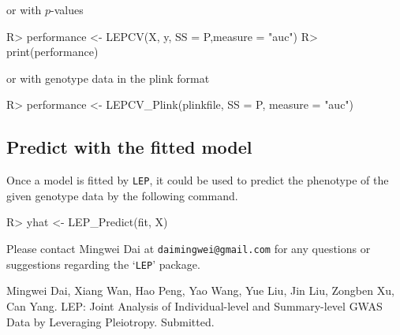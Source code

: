 \documentclass[11pt]{article}
\begin{document}
or with $p$-values
\begin{Schunk}
\begin{Sinput}
R>   performance <- LEPCV(X, y, SS = P,measure = "auc")
R>   print(performance)
\end{Sinput}
\end{Schunk}

or with genotype data in the plink format
\begin{Schunk}
\begin{Sinput}
R> performance <- LEPCV_Plink(plinkfile, SS = P, measure = "auc")
\end{Sinput}
\end{Schunk}


\subsection{Predict with the fitted model}\label{predict}
Once a model is fitted by \texttt{LEP}, it could be used to predict the phenotype of the given genotype data by the following command.
\begin{Schunk}
\begin{Sinput}
R> yhat <- LEP_Predict(fit, X)
\end{Sinput}
\end{Schunk}

Please contact Mingwei Dai at \texttt{daimingwei@gmail.com} for any questions or suggestions regarding the `\texttt{LEP}' package.


\begin{thebibliography}{99}
 Mingwei Dai, Xiang Wan, Hao Peng, Yao Wang, Yue Liu, Jin Liu, Zongben Xu, Can Yang. LEP: Joint Analysis of Individual-level and Summary-level GWAS Data by Leveraging Pleiotropy. Submitted.

\end{thebibliography}
\end{document}
